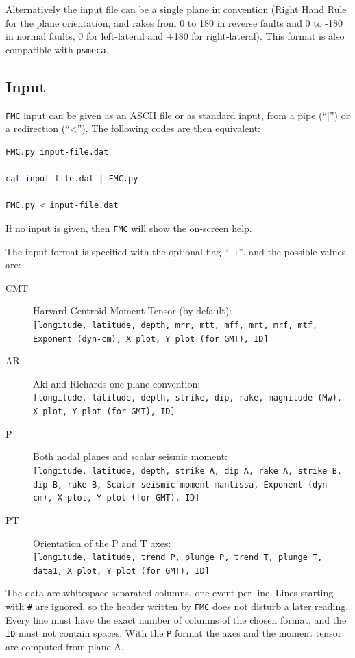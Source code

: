 \documentclass[11pt,a4paper,english]{article}
\numberwithin{equation}{section}
\begin{document}
Alternatively the input file can be a single plane in \citet{aki80}
convention (Right Hand Rule for the plane orientation, and rakes from
0 to 180 in reverse faults and 0 to -180 in normal faults, 0 for left-lateral
and $\pm$180 for right-lateral). This format is also compatible with
\texttt{psmeca}.

\subsection{Input}
\label{sec:input}

\texttt{FMC} input can be given as an ASCII file or as standard input, from a pipe (``|'') or a redirection (``<''). The following codes are then equivalent:

\begin{lstlisting}[language=bash]
FMC.py input-file.dat

cat input-file.dat | FMC.py

FMC.py < input-file.dat
\end{lstlisting}

If no input is given, then \texttt{FMC} will show the on-screen help.

The\textbf{ }input format is specified with the optional flag ``\texttt{-i}'', and the possible values are:
\begin{description}
\item[CMT] Harvard Centroid Moment Tensor (by default):\\
\texttt{[longitude, latitude, depth, mrr, mtt, mff, mrt, mrf, mtf, Exponent (dyn-cm), X plot, Y plot (for GMT), ID]}
\item[AR] Aki and Richards one plane convention:\\
\texttt{[longitude, latitude, depth, strike, dip, rake, magnitude (Mw), X plot, Y plot (for GMT), ID]}
\item[P] Both nodal planes and scalar seismic moment:\\
\texttt{[longitude, latitude, depth, strike A, dip A, rake A, strike B, dip B, rake B, Scalar seismic moment mantissa, Exponent (dyn-cm), X plot, Y plot (for GMT), ID]}
\item[PT] Orientation of the P and T axes:\\
\texttt{[longitude, latitude, trend P, plunge P, trend T, plunge T, data1, X plot, Y plot (for GMT), ID]}
\end{description}
The data are whitespace-separated columns, one event per line. Lines starting with \texttt{\#} are ignored, so the header written by \texttt{FMC} does not disturb a later reading. Every line must have the exact number of columns of the chosen format, and the \texttt{ID} must not contain spaces. With the \texttt{P} format the axes and the moment tensor are computed from plane A.
\end{document}
